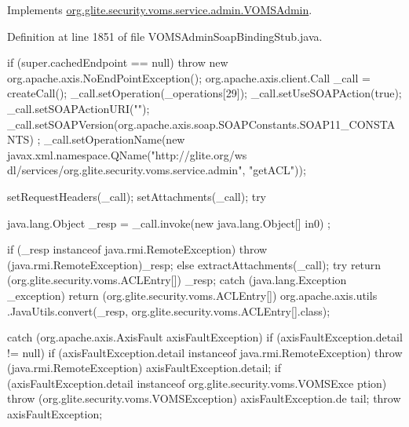 Implements \hyperlink{interfaceorg_1_1glite_1_1security_1_1voms_1_1service_1_1admin_1_1VOMSAdmin_ae13dbdb9e42f415cbe2aa7c29e789e98}{org.glite.security.voms.service.admin.VOMSAdmin}.



Definition at line 1851 of file VOMSAdminSoapBindingStub.java.


\begin{DoxyCode}
                                                                                 
                                                                       {
        if (super.cachedEndpoint == null) {
            throw new org.apache.axis.NoEndPointException();
        }
        org.apache.axis.client.Call _call = createCall();
        _call.setOperation(_operations[29]);
        _call.setUseSOAPAction(true);
        _call.setSOAPActionURI("");
        _call.setSOAPVersion(org.apache.axis.soap.SOAPConstants.SOAP11_CONSTANTS)
      ;
        _call.setOperationName(new javax.xml.namespace.QName("http://glite.org/ws
      dl/services/org.glite.security.voms.service.admin", "getACL"));

        setRequestHeaders(_call);
        setAttachments(_call);
 try {        java.lang.Object _resp = _call.invoke(new java.lang.Object[] {in0})
      ;

        if (_resp instanceof java.rmi.RemoteException) {
            throw (java.rmi.RemoteException)_resp;
        }
        else {
            extractAttachments(_call);
            try {
                return (org.glite.security.voms.ACLEntry[]) _resp;
            } catch (java.lang.Exception _exception) {
                return (org.glite.security.voms.ACLEntry[]) org.apache.axis.utils
      .JavaUtils.convert(_resp, org.glite.security.voms.ACLEntry[].class);
            }
        }
  } catch (org.apache.axis.AxisFault axisFaultException) {
    if (axisFaultException.detail != null) {
        if (axisFaultException.detail instanceof java.rmi.RemoteException) {
              throw (java.rmi.RemoteException) axisFaultException.detail;
         }
        if (axisFaultException.detail instanceof org.glite.security.voms.VOMSExce
      ption) {
              throw (org.glite.security.voms.VOMSException) axisFaultException.de
      tail;
         }
   }
  throw axisFaultException;
}
    }
\end{DoxyCode}
